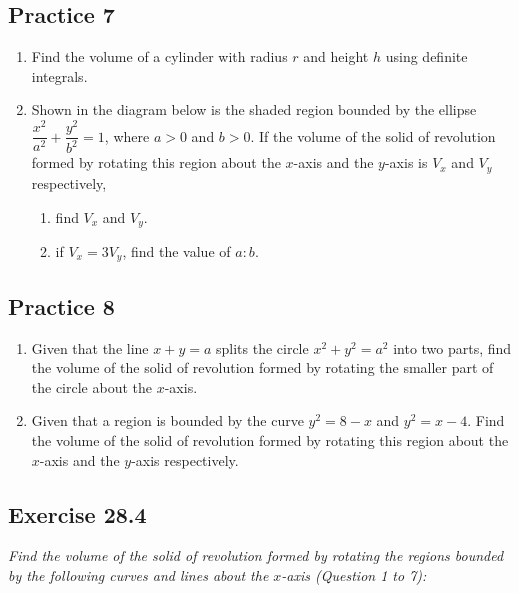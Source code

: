 \documentclass{report}
\begin{document}
\subsection{Practice 7}

\begin{enumerate}
    \item Find the volume of a cylinder with radius $r$ and height $h$ using definite
          integrals.
    \item Shown in the diagram below is the shaded region bounded by the ellipse
          $\dfrac{x^2}{a^2} + \dfrac{y^2}{b^2} = 1$, where $a > 0$ and $b > 0$. If the
          volume of the solid of revolution formed by rotating this region about the
          $x$-axis and the $y$-axis is $V_x$ and $V_y$ respectively,
          \begin{enumerate}
              \item find $V_x$ and $V_y$.
              \item if $V_x = 3V_y$, find the value of $a:b$.
          \end{enumerate}
\end{enumerate}

\subsection{Practice 8}

\begin{enumerate}
    \item Given that the line $x + y = a$ splits the circle $x^2 + y^2 = a^2$ into two
          parts, find the volume of the solid of revolution formed by rotating the
          smaller part of the circle about the $x$-axis.
    \item Given that a region is bounded by the curve $y^2 = 8 - x$ and $y^2 = x - 4$.
          Find the volume of the solid of revolution formed by rotating this region about
          the $x$-axis and the $y$-axis respectively.
\end{enumerate}

\subsection{Exercise 28.4}

\noindent \hspace{1.2em}\textit{Find the volume of the solid of revolution formed by rotating the regions bounded by the following curves and lines about the $x$-axis (Question 1 to 7):}
\end{document}
